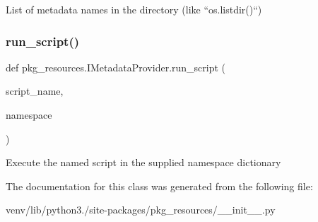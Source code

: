 \begin{DoxyVerb}List of metadata names in the directory (like ``os.listdir()``)\end{DoxyVerb}
 \mbox{\label{classpkg__resources_1_1_i_metadata_provider_a8adadb1f0ba94514272df33f5ddda4d0}} 
\subsubsection{\texorpdfstring{run\+\_\+script()}{run\_script()}}
{\footnotesize\ttfamily def pkg\+\_\+resources.\+I\+Metadata\+Provider.\+run\+\_\+script (\begin{DoxyParamCaption}\item[{}]{script\+\_\+name,  }\item[{}]{namespace }\end{DoxyParamCaption})}

\begin{DoxyVerb}Execute the named script in the supplied namespace dictionary\end{DoxyVerb}
 

The documentation for this class was generated from the following file\+:\begin{DoxyCompactItemize}
\item 
venv/lib/python3./site-\/packages/pkg\+\_\+resources/\+\_\+\+\_\+init\+\_\+\+\_\+.\+py\end{DoxyCompactItemize}
